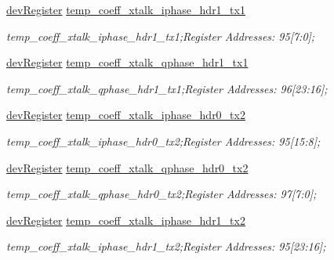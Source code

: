 \begin{DoxyCompactItemize}
\mbox{\hyperlink{classdev_register}{dev\+Register}} \mbox{\hyperlink{class_o_p_t3101_registers_a8af6b46e24efa687b02304c882a05011}{temp\+\_\+coeff\+\_\+xtalk\+\_\+iphase\+\_\+hdr1\+\_\+tx1}}
\begin{DoxyCompactList}\small\item\em temp\+\_\+coeff\+\_\+xtalk\+\_\+iphase\+\_\+hdr1\+\_\+tx1;Register Addresses\+: 95\mbox{[}7\+:0\mbox{]}; \end{DoxyCompactList}\item 
\mbox{\hyperlink{classdev_register}{dev\+Register}} \mbox{\hyperlink{class_o_p_t3101_registers_ac4864876a9fc46c97345ea1eb655f7ba}{temp\+\_\+coeff\+\_\+xtalk\+\_\+qphase\+\_\+hdr1\+\_\+tx1}}
\begin{DoxyCompactList}\small\item\em temp\+\_\+coeff\+\_\+xtalk\+\_\+qphase\+\_\+hdr1\+\_\+tx1;Register Addresses\+: 96\mbox{[}23\+:16\mbox{]}; \end{DoxyCompactList}\item 
\mbox{\hyperlink{classdev_register}{dev\+Register}} \mbox{\hyperlink{class_o_p_t3101_registers_ab5992312a6b74e2f15f3c41bbd8227e4}{temp\+\_\+coeff\+\_\+xtalk\+\_\+iphase\+\_\+hdr0\+\_\+tx2}}
\begin{DoxyCompactList}\small\item\em temp\+\_\+coeff\+\_\+xtalk\+\_\+iphase\+\_\+hdr0\+\_\+tx2;Register Addresses\+: 95\mbox{[}15\+:8\mbox{]}; \end{DoxyCompactList}\item 
\mbox{\hyperlink{classdev_register}{dev\+Register}} \mbox{\hyperlink{class_o_p_t3101_registers_a622b0f25ad8e625152766df99abf6b18}{temp\+\_\+coeff\+\_\+xtalk\+\_\+qphase\+\_\+hdr0\+\_\+tx2}}
\begin{DoxyCompactList}\small\item\em temp\+\_\+coeff\+\_\+xtalk\+\_\+qphase\+\_\+hdr0\+\_\+tx2;Register Addresses\+: 97\mbox{[}7\+:0\mbox{]}; \end{DoxyCompactList}\item 
\mbox{\hyperlink{classdev_register}{dev\+Register}} \mbox{\hyperlink{class_o_p_t3101_registers_a8b312fa4f9fb3654b54e578922c73a77}{temp\+\_\+coeff\+\_\+xtalk\+\_\+iphase\+\_\+hdr1\+\_\+tx2}}
\begin{DoxyCompactList}\small\item\em temp\+\_\+coeff\+\_\+xtalk\+\_\+iphase\+\_\+hdr1\+\_\+tx2;Register Addresses\+: 95\mbox{[}23\+:16\mbox{]}; \end{DoxyCompactList}\item 

\end{DoxyCompactItemize}
